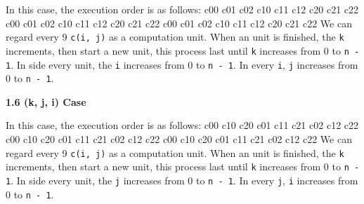 \documentclass{article}%
\newenvironment{code}%
   {\snugshade\verbatim}%
   {\endverbatim\endsnugshade}
\begin{document}
\begin{Large}
In this case, the execution order is as follows:
\begin{code}
    c00 c01 c02 c10 c11 c12 c20 c21 c22 
    c00 c01 c02 c10 c11 c12 c20 c21 c22
    c00 c01 c02 c10 c11 c12 c20 c21 c22
\end{code}
We can regard every 9 \texttt{c(i, j)} as a computation unit. When an unit is finished, the \texttt{k} increments, then start a new unit, this process last until \texttt{k} increases from 0 to \texttt{n - 1}. In side every unit, the \texttt{i} increases from 0 to \texttt{n - 1}. In every \texttt{i}, \texttt{j} increases from 0 to \texttt{n - 1}.
\newpage
\begin{LARGE}
\begin{flushleft}
\textbf{1.6 (k, j, i) Case}
\end{flushleft}
\end{LARGE}

In this case, the execution order is as follows:
\begin{code}
    c00 c10 c20 c01 c11 c21 c02 c12 c22 
    c00 c10 c20 c01 c11 c21 c02 c12 c22
    c00 c10 c20 c01 c11 c21 c02 c12 c22
\end{code}
We can regard every 9 \texttt{c(i, j)} as a computation unit. When an unit is finished, the \texttt{k} increments, then start a new unit, this process last until \texttt{k} increases from 0 to \texttt{n - 1}. In side every unit, the \texttt{j} increases from 0 to \texttt{n - 1}. In every \texttt{j}, \texttt{i} increases from 0 to \texttt{n - 1}.

\end{Large}
\end{document}
